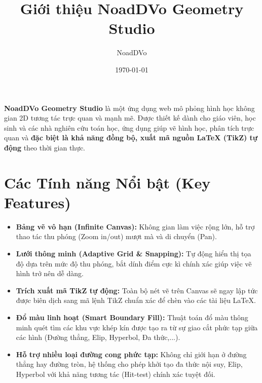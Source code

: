 \documentclass[12pt,a4paper]{article}
\title{\textbf{Giới thiệu NoadDVo Geometry Studio}}
\author{NoadDVo}
\date{\today}
\begin{document}
\maketitle

\begin{tcolorbox}[colback=blue!5,colframe=blue!40!black,title=Tổng quan (Overview)]
\textbf{NoadDVo Geometry Studio} là một ứng dụng web mô phỏng hình học không gian 2D tương tác trực quan và mạnh mẽ. Được thiết kế dành cho giáo viên, học sinh và các nhà nghiên cứu toán học, ứng dụng giúp vẽ hình học, phân tích trực quan và \textbf{đặc biệt là khả năng đồng bộ, xuất mã nguồn LaTeX (TikZ) tự động} theo thời gian thực.
\end{tcolorbox}

\section{Các Tính năng Nổi bật (Key Features)}
\begin{itemize}[label=\textbullet]
    \item \textbf{Bảng vẽ vô hạn (Infinite Canvas):} Không gian làm việc rộng lớn, hỗ trợ thao tác thu phóng (Zoom in/out) mượt mà và di chuyển (Pan).
    \item \textbf{Lưới thông minh (Adaptive Grid \& Snapping):} Tự động hiển thị tọa độ dựa trên mức độ thu phóng, bắt dính điểm cực kì chính xác giúp việc vẽ hình trở nên dễ dàng.
    \item \textbf{Trích xuất mã TikZ tự động:} Toàn bộ nét vẽ trên Canvas sẽ ngay lập tức được biên dịch sang mã lệnh TikZ chuẩn xác để chèn vào các tài liệu LaTeX.
    \item \textbf{Đổ màu linh hoạt (Smart Boundary Fill):} Thuật toán đổ màu thông minh quét tìm các khu vực khép kín được tạo ra từ sự giao cắt phức tạp giữa các hình (Đường thẳng, Elip, Hyperbol, Đa thức,...).
    \item \textbf{Hỗ trợ nhiều loại đường cong phức tạp:} Không chỉ giới hạn ở đường thẳng hay đường tròn, hệ thống cho phép khởi tạo đa thức nội suy, Elip, Hyperbol với khả năng tương tác (Hit-test) chính xác tuyệt đối.
\end{itemize}
\end{document}
